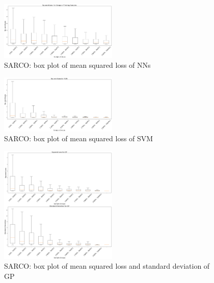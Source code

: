 \begin{figure}[h]
\centering
\includegraphics[width=0.5\textwidth]{PLT/sarcos_mlpbox.png}
\caption{SARCO: box plot of mean squared loss of NNs}
\label{fig:sarcos_mlpbox}
\end{figure}

\begin{figure}[h]
\centering
\includegraphics[width=0.5\textwidth]{PLT/sarcos_svmbox.png}
\caption{SARCO: box plot of mean squared loss of SVM}
\label{fig:sarcos_svmbox}
\end{figure}


\begin{figure}[h]
\centering
\includegraphics[width=0.5\textwidth]{PLT/sarcos_gpbox.png}
\caption{SARCO: box plot of mean squared loss and standard deviation of GP}
\label{fig:sarcos_gpbox}
\end{figure}


